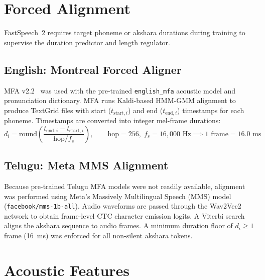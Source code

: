 \documentclass[11pt,a4paper]{report}
\begin{document}
\FloatBarrier
\vspace{1.5em}

\section{Forced Alignment}
FastSpeech~2 requires target phoneme or akshara durations during training to supervise the duration predictor and length regulator.

\subsection{English: Montreal Forced Aligner}
MFA v2.2~\cite{mfa} was used with the pre-trained \texttt{english\_mfa} acoustic model and pronunciation dictionary. MFA runs Kaldi-based HMM-GMM alignment to produce TextGrid files with start ($t_{\text{start},i}$) and end ($t_{\text{end},i}$) timestamps for each phoneme. Timestamps are converted into integer mel-frame durations:
\begin{equation}
    d_i = \mathrm{round}\left(\frac{t_{\text{end},i} - t_{\text{start},i}}{\text{hop}/f_s}\right), \qquad \text{hop}=256,\; f_s = 16{,}000\text{ Hz} \implies 1\text{ frame} = 16.0\text{ ms}
\end{equation}

\subsection{Telugu: Meta MMS Alignment}
Because pre-trained Telugu MFA models were not readily available, alignment was performed using Meta's Massively Multilingual Speech (MMS) model~\cite{mms} (\texttt{facebook/mms-1b-all}). Audio waveforms are passed through the Wav2Vec2 network to obtain frame-level CTC character emission logits. A Viterbi search aligns the akshara sequence to audio frames. A minimum duration floor of $d_i \ge 1$ frame (16~ms) was enforced for all non-silent akshara tokens.

\FloatBarrier
\vspace{1.5em}

\section{Acoustic Features}
\end{document}
